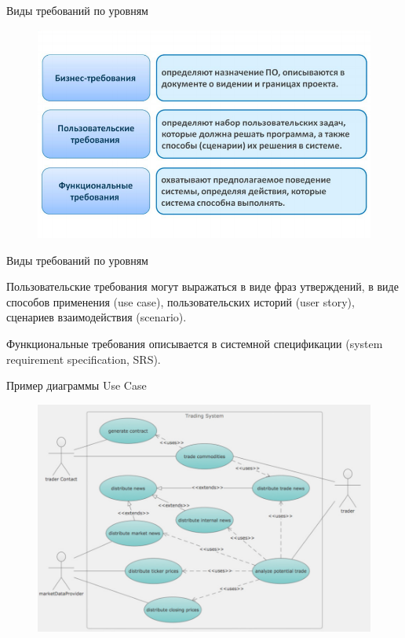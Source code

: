 \documentclass{beamer}
\begin{document}
\begin{frame}[t]{Виды требований по уровням}
\begin{figure}[h]
\centering
\includegraphics[scale=0.5]{images/lec02-pic04.png}
\end{figure}
\end{frame} 

\begin{frame}[t]{Виды требований по уровням}
\begin{block}{Пользовательские требования}
могут выражаться в виде фраз утверждений, в виде способов применения (use case),
пользовательских историй (user story), сценариев взаимодействия (scenario).
\end{block}
\begin{block}{Функциональные требования}
описывается в системной спецификации (system requirement specification, SRS).
\end{block}
\end{frame}

\begin{frame}[t]{Пример диаграммы Use Case}
\begin{figure}[h]
\centering
\includegraphics[scale=0.4]{images/lec02-pic04-02.png}
\end{figure}
\end{frame}
\end{document}
